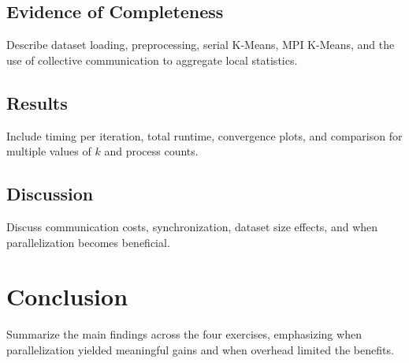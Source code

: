 \documentclass[conference]{IEEEtran}
\begin{document}
\subsection{Evidence of Completeness}
Describe dataset loading, preprocessing, serial K-Means, MPI K-Means, and the use of collective communication to aggregate local statistics.

\subsection{Results}
Include timing per iteration, total runtime, convergence plots, and comparison for multiple values of $k$ and process counts.

\subsection{Discussion}
Discuss communication costs, synchronization, dataset size effects, and when parallelization becomes beneficial.

\section{Conclusion}
Summarize the main findings across the four exercises, emphasizing when parallelization yielded meaningful gains and when overhead limited the benefits.
\end{document}
